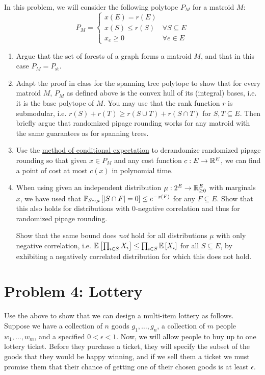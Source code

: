In this problem, we will consider the following polytope $P_M$ for a matroid $M$:
$$P_M = \begin{cases} x(E) = r(E) \\ x(S) \le r(S) & \forall S \subseteq E \\ x_e \ge 0 & \forall e \in E \end{cases}$$
\begin{enumerate}
\item Argue that the set of forests of a graph forms a matroid $M$, and that in this case $P_M = P_{\mathrm{st}}$.
\item Adapt the proof in class for the spanning tree polytope to show that for every matroid $M$, $P_M$ as defined above is the convex hull of its (integral) bases, i.e. it is the base polytope of $M$. You may use that the rank function $r$ is submodular, i.e. $r(S)+r(T) \ge r(S \cup T) + r(S \cap T)$ for $S,T \subseteq E$. Then briefly argue that randomized pipage rounding works for any matroid with the same guarantees as for spanning trees.
\item Use the \href{https://en.wikipedia.org/wiki/Method_of_conditional_probabilities}{method of conditional expectation} to derandomize randomized pipage rounding so that given $x \in P_M$ and any cost function $c:E \to \mathbb R^E$, we can find a point of cost at most $c(x)$ in polynomial time. 
\item When using given an independent distribution $\mu: 2^E \to \mathbb R^E_{\ge 0}$ with marginals $x$, we have used that ${\mathbb{P}}_{S \sim \mu}\left[|S \cap F|=0\right] \le e^{-x(F)}$ for any $F \subseteq E$. Show that this also holds for distributions with 0-negative correlation and thus for randomized pipage rounding. 

Show that the same bound does \textit{not} hold for all distributions $\mu$ with only negative correlation, i.e. ${\mathbb{E}}\left[\prod_{i \in S} X_i\right] \le \prod_{i \in S} {\mathbb{E}}\left[X_i\right]$ for all $S \subseteq E$, by exhibiting a negatively correlated distribution for which this does not hold. 
\end{enumerate}

\section{Problem 4: Lottery}

Use the above to show that we can design a multi-item lottery as follows. Suppose we have a collection of $n$ goods $g_1,\dots,g_n$, a collection of $m$ people $w_1,\dots,w_m$, and a specified $0 < \epsilon < 1$. Now, we will allow people to buy up to one lottery ticket. Before they purchase a ticket, they will specify the subset of the goods that they would be happy winning, and if we sell them a ticket we must promise them that their chance of getting one of their chosen goods is at least $\epsilon$. 

